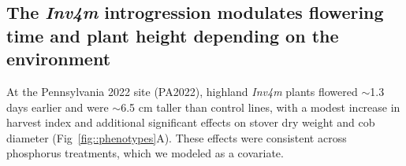 \documentclass[9pt,twocolumn,twoside]{rilabRxiv}
\newcommand{\invfour}{\textit{Inv4m}\xspace}
\begin{document}




\subsection{The \invfour introgression modulates flowering time and plant height depending on the environment}
At the Pennsylvania 2022 site (PA2022), highland \invfour plants flowered $\sim$1.3 days earlier and were $\sim$6.5 cm taller than control lines, with a modest increase in harvest index and additional significant effects on stover dry weight and cob diameter (Fig~\ref{fig::phenotypes}A). These effects were consistent across phosphorus treatments, which we modeled as a covariate.
\end{document}
